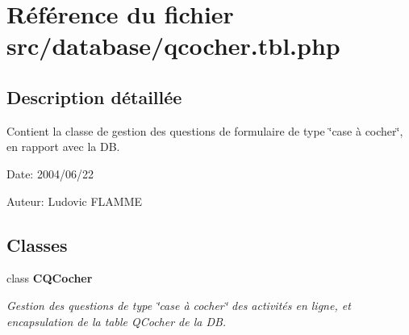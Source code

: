 \section{Référence du fichier src/database/qcocher.tbl.php}
\label{qcocher_8tbl_8php}


\subsection{Description détaillée}
Contient la classe de gestion des questions de formulaire de type \char`\"{}case à cocher\char`\"{}, en rapport avec la DB. 

\begin{Desc}
\item[Date:]2004/06/22\end{Desc}
\begin{Desc}
\item[Auteur:]Ludovic FLAMME \end{Desc}


\subsection*{Classes}
\begin{CompactItemize}
\item 
class {\bf CQCocher}
\begin{CompactList}\small\item\em Gestion des questions de type \char`\"{}case à cocher\char`\"{} des activités en ligne, et encapsulation de la table QCocher de la DB. \item\end{CompactList}\end{CompactItemize}
